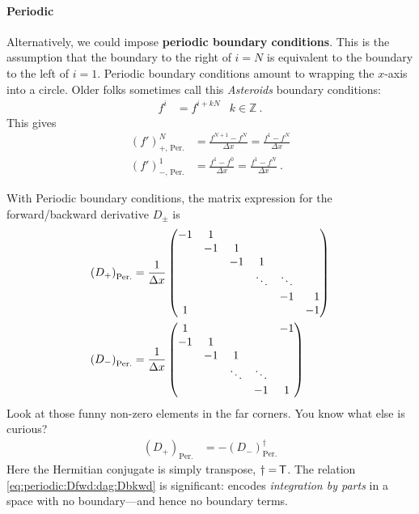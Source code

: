 \paragraph{Periodic} Alternatively, we could  impose \textbf{periodic boundary conditions}. This is the assumption that the boundary to the right of $i=N$ is equivalent to the boundary to the left of $i=1$. Periodic boundary conditions amount to wrapping the $x$-axis into a circle. Older folks sometimes call this \emph{Asteroids} boundary conditions:
\begin{align}
  f^{i} &= f^{i+ kN}
  & k\in \mathbb{Z} \ .
\end{align}
This gives
\begin{align}
    (f')^N_\text{$+$, Per.} 
    &= \frac{f^{N+1} - f^N}{\Delta x}
    = \frac{f^1- f^N}{\Delta x}  
    \\
    (f')^1_\text{$-$, Per.} 
    &=\frac{f^{1} - f^0}{\Delta x} 
    = \frac{f^{1} - f^N}{\Delta x} 
  \ .
\end{align}
\begin{example}
With Periodic boundary conditions, the matrix expression for the forward/backward derivative $D_\pm$ is
\begin{align}
    \left(D_+\right)_\text{Per.}
    &=
    \frac{1}{\Delta x}
    \begin{pmatrix}
        -1 & 1 & & &  \\
        & -1 & 1 & &  \\
        & & -1 & 1 &  \\
        & & & \ddots & \ddots &  \\
        & & & & -1 & \pp 1 \\
        1 & & & & & -1 
    \end{pmatrix}
    \\
    \left(D_-\right)_\text{Per.}
    &=
    \frac{1}{\Delta x}
    \begin{pmatrix}
        1 & & & &  -1\\
         -1 & 1 & &  \\
        & -1 & 1 &  \\
         & & \ddots & \ddots &  \\
        & & & -1 &  1 
    \end{pmatrix}
\end{align}
Look at those funny non-zero elements in the far corners. You know what else is curious? 
\begin{align}
    \left(D_+\right)_\text{Per.}
    &=
    -\left(D_-\right)_\text{Per.}^\dag
    \label{eq:periodic:Dfwd:dag:Dbkwd}
\end{align}
Here the Hermitian conjugate is simply transpose, $\dag = {\mkern-1.5mu\mathsf{T}}$.
The relation \eqref{eq:periodic:Dfwd:dag:Dbkwd} is significant: encodes \emph{integration by parts} in a space with no boundary---and hence no boundary terms.
\end{example}

